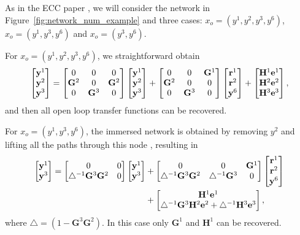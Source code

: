 \documentclass[11pt,a4paper]{article}
\begin{document}
As in the ECC paper \cite{ECC_subnets}, we will consider the network in Figure~\ref{fig:network_num_example} and three cases: $x_o = (y^1,y^2,y^3,y^6)$, $x_o = (y^1,y^3,y^6)$ and $x_o = (y^3,y^6)$.


For $x_o = (y^1,y^2,y^3,y^6)$, we straightforward obtain
\begin{align*}
    \begin{bmatrix} \mathbf y^1 \\ \mathbf y^2 \\ \mathbf y^3 \end{bmatrix} = \begin{bmatrix} 0 & 0 & 0 \\ \mathbf G^2 & 0 & \mathbf G^2 \\ 0 & \mathbf G^3 & 0 \end{bmatrix} \begin{bmatrix} \mathbf y^1 \\ \mathbf y^2 \\ \mathbf y^3 \end{bmatrix} +  \begin{bmatrix} 0 & 0 & \mathbf G^1 \\ \mathbf G^2 & 0 & 0 \\ 0 & \mathbf G^3 & 0 \end{bmatrix} \begin{bmatrix} \mathbf r^1 \\ \mathbf r^2 \\ \mathbf y^6 \end{bmatrix} + \begin{bmatrix} \mathbf H^1 \mathbf e^1 \\ \mathbf H^2 \mathbf e^2 \\ \mathbf H^3 \mathbf e^3 \end{bmatrix},
\end{align*}
and then all open loop transfer functions can be recovered.

For $x_o = (y^1,y^3,y^6)$, the immersed network is obtained by removing $y^2$ and lifting all the paths through this node \cite{Dankers_predictor_input}, resulting in 
\begin{align*}
    \begin{bmatrix} \mathbf y^1 \\ \mathbf y^3 \end{bmatrix} = \begin{bmatrix} 0 & 0 \\ \mathbf \triangle^{-1} \mathbf G^3 \mathbf G^2 & 0 \end{bmatrix} \begin{bmatrix} \mathbf y^1 \\ \mathbf y^3 \end{bmatrix} &+ \begin{bmatrix} 0 & 0 & \mathbf G^1 \\ \mathbf \triangle^{-1} \mathbf G^3 \mathbf G^2 & \mathbf \triangle^{-1} \mathbf G^3 & 0 \end{bmatrix} \begin{bmatrix} \mathbf r^1 \\ \mathbf r^2 \\ \mathbf y^6 \end{bmatrix} \\ & + \begin{bmatrix} \mathbf H^1 \mathbf e^1 \\ \mathbf \triangle^{-1} \mathbf G^3 \mathbf H^2 \mathbf e^2 + \mathbf \triangle^{-1} \mathbf H^3 \mathbf e^3 \end{bmatrix},
\end{align*}
where $\mathbf \triangle = (1-\mathbf G^3\mathbf G^2)$. In this case only $\mathbf G^1$ and $\mathbf H^1$ can be recovered.
\end{document}
